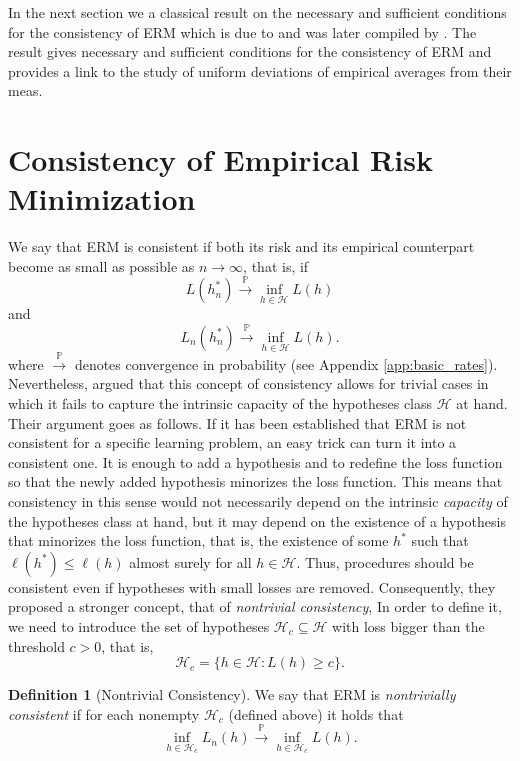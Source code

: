 \documentclass{uvamath}
\newcommand*{\calH}{\mathcal{H}}
\newcommand*{\bbP}{\mathbb{P}}
\newcommand*{\toinP}{\overset{\bbP}{\longrightarrow}}
\theoremstyle{remark}
\theoremstyle{definition}
\theoremstyle{definition}
\newtheorem{definition}[theorem]{Definition}
\theoremstyle{definition}
\theoremstyle{definition}
\theoremstyle{definition}
\begin{document}
In the next section we a classical result on the necessary and
sufficient conditions for the consistency of ERM which is due to
\citet{vapnik_necessary_1991} and was later compiled by
\citet{vapnik_statistical_1998}. The result gives necessary and
sufficient conditions for the consistency of ERM and provides a link
to the study of uniform deviations of empirical averages from their
meas.

\section{Consistency of Empirical Risk
  Minimization \label{sect:erm_consistency}}

We say that ERM is consistent if both its risk and its empirical
counterpart become as small as possible as $n\to\infty$, that is, if
\begin{equation*}
  L(h^*_n) \toinP \inf_{h\in\calH}L(h)
\end{equation*}
and
\begin{equation*}
  L_n(h^*_n) \toinP \inf_{h\in\calH}L(h).
\end{equation*}
where $\toinP$ denotes convergence in probability (see Appendix
\ref{app:basic_rates}). Nevertheless, \citet{vapnik_nature_2000}
argued that this concept of consistency allows for trivial cases in
which it fails to capture the intrinsic capacity of the hypotheses
class $\calH$ at hand. Their argument goes as follows. If it has been
established that ERM is not consistent for a specific learning
problem, an easy trick can turn it into a consistent one. It is enough
to add a hypothesis and to redefine the loss function so that the
newly added hypothesis minorizes the loss function. This means that
consistency in this sense would not necessarily depend on the
intrinsic \textit{capacity} of the hypotheses class at hand, but it
may depend on the existence of a hypothesis that minorizes the loss
function, that is, the existence of some $h^*$ such that
$\ell(h^*)\leq \ell(h)$ almost surely for all $h\in\calH$. Thus,
procedures should be consistent even if hypotheses with small losses
are removed. Consequently, they proposed a stronger concept, that of
\textit{nontrivial consistency}, In order to define it, we need to
introduce the set of hypotheses $\calH_c\subseteq\calH$ with loss
bigger than the threshold $c>0$, that is,
\begin{equation*}
  \calH_c = \{h\in\calH : L(h)\geq c\}.
\end{equation*}

\begin{definition}[Nontrivial Consistency]
  We say that ERM is \textit{nontrivially consistent} if for each
  nonempty $\calH_c$ (defined above) it holds that
  \begin{equation*}
    \inf_{h\in\calH_c}L_n(h) \toinP \inf_{h\in\calH_c}L(h).
  \end{equation*}
\end{definition}
\end{document}

